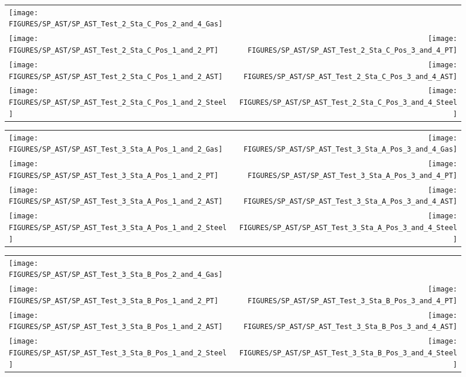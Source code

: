 \begin{figure}[p]
\begin{tabular*}{\textwidth}{l@{\extracolsep{\fill}}r}
\texttt{[image: FIGURES/SP\_AST/SP\_AST\_Test\_2\_Sta\_C\_Pos\_2\_and\_4\_Gas]} &
  \\
\texttt{[image: FIGURES/SP\_AST/SP\_AST\_Test\_2\_Sta\_C\_Pos\_1\_and\_2\_PT]} &
\texttt{[image: FIGURES/SP\_AST/SP\_AST\_Test\_2\_Sta\_C\_Pos\_3\_and\_4\_PT]} \\
\texttt{[image: FIGURES/SP\_AST/SP\_AST\_Test\_2\_Sta\_C\_Pos\_1\_and\_2\_AST]} &
\texttt{[image: FIGURES/SP\_AST/SP\_AST\_Test\_2\_Sta\_C\_Pos\_3\_and\_4\_AST]} \\
\texttt{[image: FIGURES/SP\_AST/SP\_AST\_Test\_2\_Sta\_C\_Pos\_1\_and\_2\_Steel]} &
\texttt{[image: FIGURES/SP\_AST/SP\_AST\_Test\_2\_Sta\_C\_Pos\_3\_and\_4\_Steel]}
\end{tabular*}
\label{SP_Test_2_Station_C}
\end{figure}


\begin{figure}[p]
\begin{tabular*}{\textwidth}{l@{\extracolsep{\fill}}r}
\texttt{[image: FIGURES/SP\_AST/SP\_AST\_Test\_3\_Sta\_A\_Pos\_1\_and\_2\_Gas]} &
\texttt{[image: FIGURES/SP\_AST/SP\_AST\_Test\_3\_Sta\_A\_Pos\_3\_and\_4\_Gas]} \\
\texttt{[image: FIGURES/SP\_AST/SP\_AST\_Test\_3\_Sta\_A\_Pos\_1\_and\_2\_PT]} &
\texttt{[image: FIGURES/SP\_AST/SP\_AST\_Test\_3\_Sta\_A\_Pos\_3\_and\_4\_PT]} \\
\texttt{[image: FIGURES/SP\_AST/SP\_AST\_Test\_3\_Sta\_A\_Pos\_1\_and\_2\_AST]} &
\texttt{[image: FIGURES/SP\_AST/SP\_AST\_Test\_3\_Sta\_A\_Pos\_3\_and\_4\_AST]} \\
\texttt{[image: FIGURES/SP\_AST/SP\_AST\_Test\_3\_Sta\_A\_Pos\_1\_and\_2\_Steel]} &
\texttt{[image: FIGURES/SP\_AST/SP\_AST\_Test\_3\_Sta\_A\_Pos\_3\_and\_4\_Steel]}
\end{tabular*}
\label{SP_Test_3_Station_A}
\end{figure}

\begin{figure}[p]
\begin{tabular*}{\textwidth}{l@{\extracolsep{\fill}}r}
\texttt{[image: FIGURES/SP\_AST/SP\_AST\_Test\_3\_Sta\_B\_Pos\_2\_and\_4\_Gas]} &
  \\
\texttt{[image: FIGURES/SP\_AST/SP\_AST\_Test\_3\_Sta\_B\_Pos\_1\_and\_2\_PT]} &
\texttt{[image: FIGURES/SP\_AST/SP\_AST\_Test\_3\_Sta\_B\_Pos\_3\_and\_4\_PT]} \\
\texttt{[image: FIGURES/SP\_AST/SP\_AST\_Test\_3\_Sta\_B\_Pos\_1\_and\_2\_AST]} &
\texttt{[image: FIGURES/SP\_AST/SP\_AST\_Test\_3\_Sta\_B\_Pos\_3\_and\_4\_AST]} \\
\texttt{[image: FIGURES/SP\_AST/SP\_AST\_Test\_3\_Sta\_B\_Pos\_1\_and\_2\_Steel]} &
\texttt{[image: FIGURES/SP\_AST/SP\_AST\_Test\_3\_Sta\_B\_Pos\_3\_and\_4\_Steel]}
\end{tabular*}
\label{SP_Test_3_Station_B}
\end{figure}

